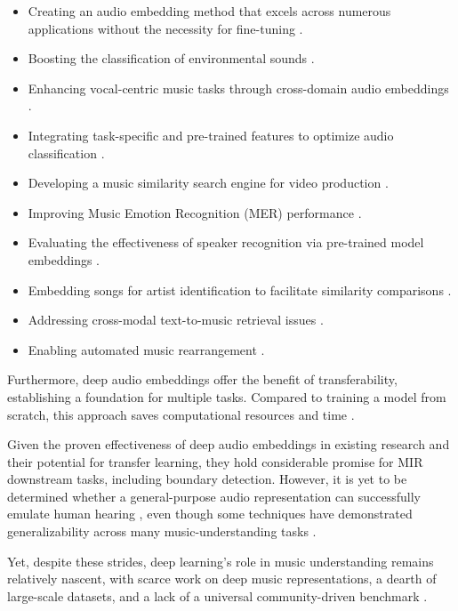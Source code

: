 \begin{itemize}
\item Creating an audio embedding method that excels across numerous applications without the necessity for fine-tuning \cite{Turian2022HEAR:Representations}.
\item Boosting the classification of environmental sounds \cite{CramerLOOKEMBEDDINGS}.
\item Enhancing vocal-centric music tasks through cross-domain audio embeddings \cite{Kim2021LearningLoss}.
\item Integrating task-specific and pre-trained features to optimize audio classification \cite{Hung2022Feature-informedClassification}.
\item Developing a music similarity search engine for video production \cite{epidemic}.
\item Improving Music Emotion Recognition (MER) performance \cite{KohComparisonRecognition}.
\item Evaluating the effectiveness of speaker recognition via pre-trained model embeddings \cite{lightweight}.
\item Embedding songs for artist identification to facilitate similarity comparisons \cite{contentmusicsimtriplet2020}.
\item Addressing cross-modal text-to-music retrieval issues \cite{WonEmotionStories}.
\item Enabling automated music rearrangement \cite{Stoller2018IntuitiveTransitions, Plachouras2023MusicSegmentation}.
\end{itemize}

Furthermore, deep audio embeddings offer the benefit of transferability, establishing a foundation for multiple tasks. Compared to training a model from scratch, this approach saves computational resources and time \cite{transferMIR2013, CifkaDeepTransfer}.

Given the proven effectiveness of deep audio embeddings in existing research and their potential for transfer learning, they hold considerable promise for MIR downstream tasks, including boundary detection. However, it is yet to be determined whether a general-purpose audio representation can successfully emulate human hearing \cite{Turian2022HEAR:Representations}, even though some techniques have demonstrated generalizability across many music-understanding tasks \cite{Li2023MERT:Training, Kim2020OneStrategies}.

Yet, despite these strides, deep learning's role in music understanding remains relatively nascent, with scarce work on deep music representations, a dearth of large-scale datasets, and a lack of a universal community-driven benchmark \cite{Turian2022HEAR:Representations, Yuan2023MARBLE:Evaluation}.